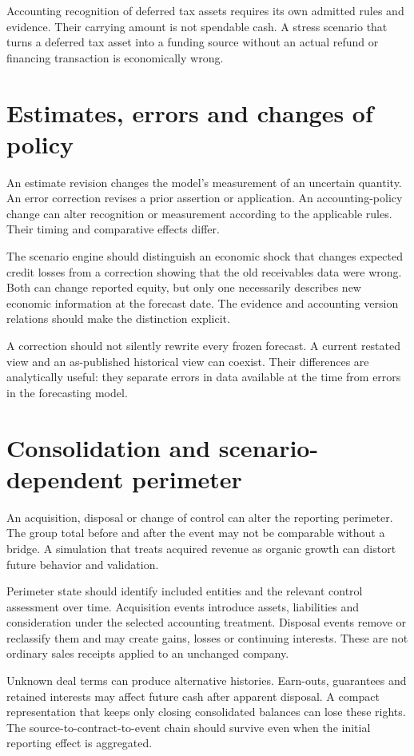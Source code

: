 Accounting recognition of deferred tax assets requires its own admitted rules and evidence. Their carrying amount is not spendable cash. A stress scenario that turns a deferred tax asset into a funding source without an actual refund or financing transaction is economically wrong.

\section{Estimates, errors and changes of policy}
An estimate revision changes the model's measurement of an uncertain quantity. An error correction revises a prior assertion or application. An accounting-policy change can alter recognition or measurement according to the applicable rules. Their timing and comparative effects differ.

The scenario engine should distinguish an economic shock that changes expected credit losses from a correction showing that the old receivables data were wrong. Both can change reported equity, but only one necessarily describes new economic information at the forecast date. The evidence and accounting version relations should make the distinction explicit.

A correction should not silently rewrite every frozen forecast. A current restated view and an as-published historical view can coexist. Their differences are analytically useful: they separate errors in data available at the time from errors in the forecasting model.

\section{Consolidation and scenario-dependent perimeter}
An acquisition, disposal or change of control can alter the reporting perimeter. The group total before and after the event may not be comparable without a bridge. A simulation that treats acquired revenue as organic growth can distort future behavior and validation.

Perimeter state should identify included entities and the relevant control assessment over time. Acquisition events introduce assets, liabilities and consideration under the selected accounting treatment. Disposal events remove or reclassify them and may create gains, losses or continuing interests. These are not ordinary sales receipts applied to an unchanged company.

Unknown deal terms can produce alternative histories. Earn-outs, guarantees and retained interests may affect future cash after apparent disposal. A compact representation that keeps only closing consolidated balances can lose these rights. The source-to-contract-to-event chain should survive even when the initial reporting effect is aggregated.

